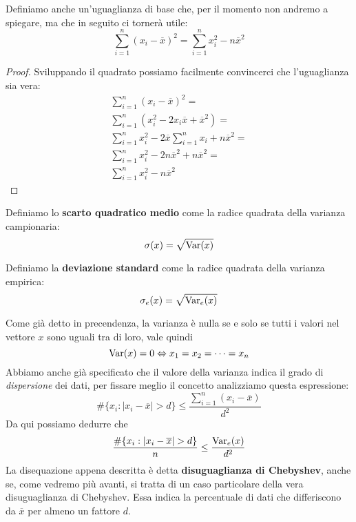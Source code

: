 \begin{definition}
	Definiamo anche un'uguaglianza di base che, per il momento non andremo a spiegare, ma che in
	seguito ci tornerà utile:
	\[ \sum_{i=1}^n (x_i - \overline{x})^2 = \sum_{i=1}^n x_i^2 - n \overline{x}^2 \]
	\begin{proof}
		Sviluppando il quadrato possiamo facilmente convincerci che l'uguaglianza sia vera:
		\begin{align*}
			\sum_{i=1}^n (x_i - \overline{x})^2 =                                     \\
			\sum_{i=1}^n (x_i^2 - 2 x_i \overline{x} + \overline{x}^2) =              \\
			\sum_{i=1}^n x_i^2 - 2 \overline{x} \sum_{i=1}^n x_i + n \overline{x}^2 = \\
			\sum_{i=1}^n x_i^2 - 2 n \overline{x}^2 + n \overline{x}^2 =              \\
			\sum_{i=1}^n x_i^2 - n \overline{x}^2
		\end{align*}
	\end{proof}
\end{definition}

\begin{definition}
	Definiamo lo \textbf{scarto quadratico medio} come la radice quadrata della varianza
	campionaria:
	\[ \sigma (x) = \sqrt{\operatorname{Var} (x)} \]
\end{definition}

\begin{definition}
	Definiamo la \textbf{deviazione standard} come la radice quadrata della varianza empirica:
	\[ \sigma_e (x) = \sqrt{\operatorname{Var}_e (x)} \]
\end{definition}

Come già detto in precendenza, la varianza è nulla se e solo se tutti i valori nel vettore $x$
sono uguali tra di loro, vale quindi
\[ \operatorname{Var}(x) = 0 \Leftrightarrow x_1 = x_2 = \dots = x_n \]
Abbiamo anche già specificato che il valore della varianza indica il grado di \emph{dispersione}
dei dati, per fissare meglio il concetto analizziamo questa espressione:
\[ \# \{ x_i : |x_i - \overline{x}| > d  \} \leq \frac{\sum_{i=1}^n (x_i - \overline{x})}{d^2} \]
Da qui possiamo dedurre che
\[ \frac{\# \{ x_i : |x_i - \overline{x}| > d \}}{n} \leq \frac{\operatorname{Var}_e(x)}{d^2} \]
La disequazione appena descritta è detta \textbf{disuguaglianza di Chebyshev}, anche se, come
vedremo più avanti, si tratta di un caso particolare della vera disuguaglianza di Chebyshev. Essa
indica la percentuale di dati che differiscono da $\overline{x}$ per almeno un fattore $d$.

